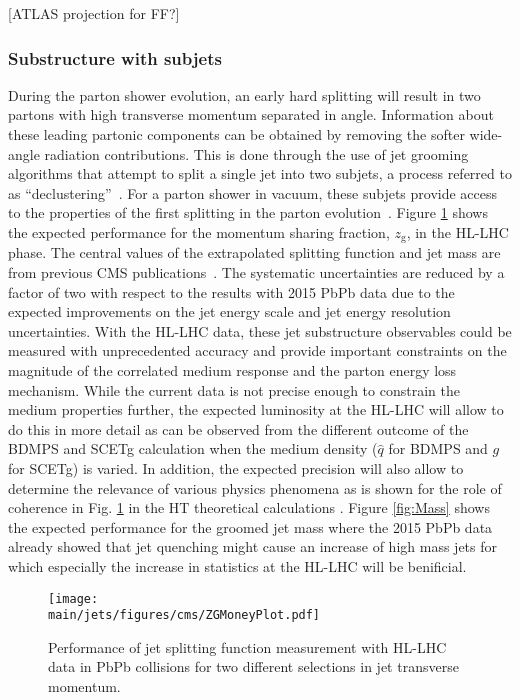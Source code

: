 [ATLAS projection for FF?]


\subsubsection{Substructure with subjets}
During the parton shower evolution, an early hard splitting will result in two partons with high transverse momentum separated in angle. Information about these leading partonic components can be obtained by removing the softer wide-angle radiation contributions. This is done through the use of jet grooming algorithms that attempt to split a single jet into two subjets, a process referred to as ``declustering''~\cite{Ellis:2009me,Butterworth:2008iy,Krohn:2009th,Dasgupta:2013ihk,Larkoski:2014wba}. For a parton shower in vacuum, these subjets provide access to the properties of the first splitting in the parton evolution~\cite{Altarelli:1977zs,Larkoski:2015lea}. Figure \ref{fig:ZG} shows the expected performance for the momentum sharing fraction, $z_{\mathrm{g}}$, in the HL-LHC phase. The central values of the extrapolated splitting function and jet mass are from previous CMS publications~\cite{Sirunyan:2017bsd,Sirunyan:2018gct}. The systematic uncertainties are reduced by a factor of two with respect to the results with 2015 PbPb data due to the expected improvements on the jet energy scale and jet energy resolution uncertainties. With the HL-LHC data, these jet substructure observables could be measured with unprecedented accuracy and provide important constraints on the magnitude of the correlated medium response and the parton energy loss mechanism. While the current data is not precise enough to constrain the medium properties further, the expected luminosity at the HL-LHC will allow to do this in more detail as can be observed from the different outcome of the BDMPS \cite{Mehtar-Tani:2016aco} and SCETg \cite{Chien:2016led} calculation when the medium density ($\hat{q}$ for BDMPS and $g$ for SCETg) is varied. In addition, the expected precision will also allow to determine the relevance of various physics phenomena as is shown for the role of coherence in Fig. \ref{fig:ZG} in the HT theoretical calculations \cite{Chang:2017gkt}. Figure \ref{fig:Mass} shows the expected performance for the groomed jet mass where the 2015 PbPb data already showed that jet quenching might cause an increase of high mass jets \cite{Sirunyan:2018gct} for which especially the increase in statistics at the HL-LHC will be benificial.
\begin{figure}[!ht]
\begin{center}
\texttt{[image: \\main/jets/figures/cms/ZGMoneyPlot.pdf]}
\caption{Performance of jet splitting function measurement with HL-LHC data in PbPb collisions for two different selections in jet transverse momentum. \cite{CMS-FTR-17-002:2017dec}}
\label{fig:ZG}
\end{center}
\end{figure}

